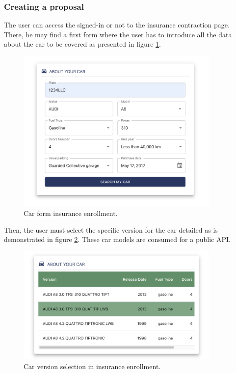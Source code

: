 \subsubsection{Creating a proposal}
{
The user can access the signed-in or not to the insurance contraction page. There, he may find a first form where the user has to introduce all the data about the car to be covered as presented in figure \ref{fig:checkout-car-form}.

\begin{figure}[H]
\centering
\includegraphics[width=10cm]{img/results/checkout-car.png}
\caption[Insurechain: Car form insurance enrollment]{\footnotesize{Car form insurance enrollment.}}
\label{fig:checkout-car-form}
\end{figure}
Then, the user must select the specific version for the car detailed as is demonstrated in figure \ref{fig:checkout-select-version}. These car models are consumed for a public API.

\begin{figure}[H]
\centering
\includegraphics[width=10cm]{img/results/checkout-select-version.png}
\caption[Insurechain: Car version selection in insurance enrollment]{\footnotesize{Car version selection in insurance enrollment.}}
\label{fig:checkout-select-version}
\end{figure}

}
